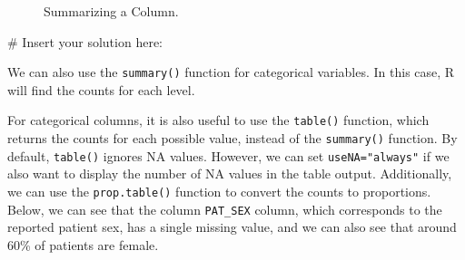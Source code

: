 \documentclass[
  letterpaper,
]{krantz}
\makeatletter
\newenvironment{Shaded}{\begin{snugshade}}{\end{snugshade}}
\newcommand{\AttributeTok}[1]{\textcolor[rgb]{0.40,0.45,0.13}{#1}}
\newcommand{\CommentTok}[1]{\textcolor[rgb]{0.37,0.37,0.37}{#1}}
\newcommand{\FunctionTok}[1]{\textcolor[rgb]{0.28,0.35,0.67}{#1}}
\newcommand{\NormalTok}[1]{\textcolor[rgb]{0.00,0.23,0.31}{#1}}
\newcommand{\SpecialCharTok}[1]{\textcolor[rgb]{0.37,0.37,0.37}{#1}}
\newcommand{\StringTok}[1]{\textcolor[rgb]{0.13,0.47,0.30}{#1}}
\newenvironment{kframe}{%
\medskip{}
\setlength{\fboxsep}{.8em}
 \def\at@end@of@kframe{}%
 \ifinner\ifhmode%
  \def\at@end@of@kframe{\end{minipage}}%
  \begin{minipage}{\columnwidth}%
 \fi\fi%
 \def\FrameCommand##1{\hskip\@totalleftmargin \hskip-\fboxsep
 \colorbox{shadecolor}{##1}\hskip-\fboxsep
     \hskip-\linewidth \hskip-\@totalleftmargin \hskip\columnwidth}%
 \MakeFramed {\advance\hsize-\width
   \@totalleftmargin\z@ \linewidth\hsize
   \@setminipage}}%
 {\par\unskip\endMakeFramed%
 \at@end@of@kframe}
\renewenvironment{Shaded}{\begin{kframe}}{\end{kframe}}
\makeatother
\begin{document}
\begin{figure}


\caption{\label{fig-sleep-disturb-hist}Summarizing a Column.}

\end{figure}%

\begin{Shaded}
\begin{Highlighting}[]
\CommentTok{\# Insert your solution here:}
\end{Highlighting}
\end{Shaded}

We can also use the \texttt{summary()} function for categorical
variables. In this case, R will find the counts for each level.

\begin{Shaded}
\end{Shaded}

For categorical columns, it is also useful to use the \texttt{table()}
function, which returns the counts for each possible value, instead of
the \texttt{summary()} function. By default, \texttt{table()} ignores NA
values. However, we can set \texttt{useNA="always"} if we also want to
display the number of NA values in the table output. Additionally, we
can use the \texttt{prop.table()} function to convert the counts to
proportions. Below, we can see that the column \texttt{PAT\_SEX} column,
which corresponds to the reported patient sex, has a single missing
value, and we can also see that around 60\% of patients are female.

\begin{Shaded}
\end{Shaded}
\end{document}
